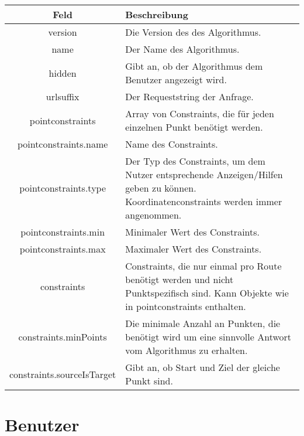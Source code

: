 \documentclass[ngerman,titlepage,parskip=true]{scrartcl}
\begin{document}
    \noindent \begin{tabular}{|c|p{11.5cm}|}
    	\hline
    	\textbf{Feld} & \textbf{Beschreibung} \\ 
    	\hline \hline
    	
    	version & Die Version des des Algorithmus. \\ 
    	\hline
    	
    	name & Der Name des Algorithmus. \\
    	\hline
    	
    	hidden & Gibt an, ob der Algorithmus dem Benutzer angezeigt wird. \\
    	\hline
    	
    	urlsuffix & Der Requeststring der Anfrage. \\
    	\hline
    	
    	pointconstraints & Array von Constraints, die für jeden einzelnen Punkt benötigt werden. \\
    	\hline
    	
    	pointconstraints.name & Name des Constraints. \\
    	\hline
    	
    	pointconstraints.type & Der Typ des Constraints, um dem Nutzer entsprechende Anzeigen/Hilfen geben zu können. Koordinatenconstraints werden immer angenommen.\\ 
    	\hline
    	
    	pointconstraints.min & Minimaler Wert des Constraints. \\
    	\hline
    	
    	pointconstraints.max & Maximaler Wert des Constraints. \\
    	\hline
    	
    	constraints & Constraints, die nur einmal pro Route benötigt werden und nicht Punktspezifisch sind. Kann Objekte wie in pointconstraints enthalten. \\
    	\hline
    	
    	constraints.minPoints & Die minimale Anzahl an Punkten, die benötigt wird um eine sinnvolle Antwort vom Algorithmus zu erhalten.\\ 
		\hline
		
		constraints.sourceIsTarget & Gibt an, ob Start und Ziel der gleiche Punkt sind.\\    		\hline    		
   	\end{tabular}
   	\clearpage
\section{Benutzer}
\end{document}
